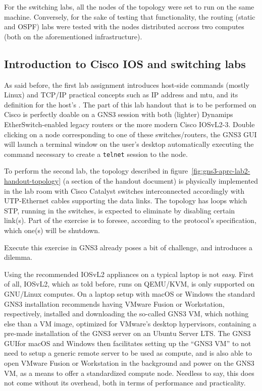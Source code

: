 For the switching labs, all the nodes of the topology were set to run on the same machine.
Conversely, for the sake of testing that functionality, the routing (static and OSPF) labs were tested with the nodes distributed accross two computes (both on the aforementioned infrastructure).



\subsection{Introduction to Cisco IOS and switching labs}
\label{subsec:gns3introswitching}

As said before, the first lab assignment introduces host-side commands (mostly Linux) and TCP/IP practical concepts such as IP address and \acrshort{mtu}, and its definition for the host's .
The part of this lab handout that is to be performed on Cisco is perfectly doable on a GNS3 session with both (lighter) Dynamips EtherSwitch-enabled legacy routers or the more modern Cisco IOSvL2-3.
Double clicking on a node corresponding to one of these switches/routers, the GNS3 GUI will launch a terminal window on the user's desktop automatically executing the command necessary to create a \texttt{telnet} session to the node.

To perform the second lab, the topology described in figure~\ref{fig:gns3-aprc-lab2-handout-topology} (a section of the handout document) is physically implemented in the lab room with Cisco Catalyst switches interconnected accordingly with UTP-Ethernet cables supporting the data links.
The topology has loops which STP, running in the switches, is expected to eliminate by disabling certain link(s).
Part of the exercise is to foresee, according to the protocol's specification, which one(s) will be shutdown.

Execute this exercise in GNS3 already poses a bit of challenge, and introduces a dilemma.

Using the recommended IOSvL2 appliances on a typical laptop is not \emph{easy}.
First of all, IOSvL2, which as told before, runs on QEMU/KVM, is only supported on GNU/Linux computes.
On a laptop setup with macOS or Windows the standard GNS3 installation recommends having VMware Fusion or Workstation, respectively, installed and downloading the so-called GNS3 VM, which nothing else than a VM image, optimized for VMware's desktop hypervisors, containing a pre-made installation of the GNS3 server on an Ubuntu Server LTS.
The GNS3 GUIfor macOS and Windows then facilitates setting up the ``GNS3 VM'' to not need to setup a generic remote server to be used as compute, and is also able to open VMware Fusion or Workstation in the background and power on the GNS3 VM, as a means to offer a standardized compute node.
Needless to say, this does not come without its overhead, both in terms of performance and practicality.

